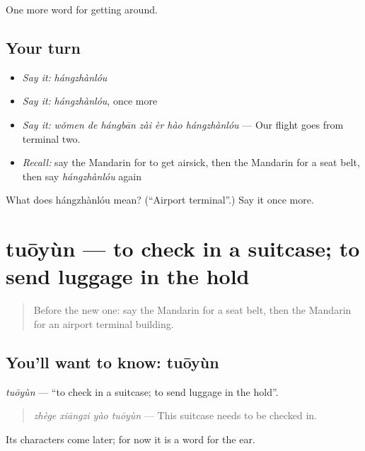 \begin{grammarlens}[title={What you've built}]
One more word for getting around.
\end{grammarlens}

\subsection*{Your turn}
\begin{itemize}
\raggedright
  \item \emph{Say it:} \emph{hángzhànlóu}
  \item \emph{Say it:} \emph{hángzhànlóu}, once more
  \item \emph{Say it:} \emph{wǒmen de hángbān zài èr hào hángzhànlóu} — Our flight goes from terminal two.
  \item \emph{Recall:} say the Mandarin for to get airsick, then the Mandarin for a seat belt, then say \emph{hángzhànlóu} again
\end{itemize}

\begin{tcolorbox}[breakable,colback=teal!4,colframe=teal!35!black,title={Before you move on}]
What does hángzhànlóu mean? (\textquotedblleft{}Airport terminal\textquotedblright{}.) Say it once more.
\end{tcolorbox}
\section[tuōyùn]{tuōyùn — to check in a suitcase; to send luggage in the hold}

\label{lesson:ZH-C415-tuoyun}



\begin{quote}
Before the new one: say the Mandarin for a seat belt, then the Mandarin for an airport terminal building.
\end{quote}

\subsection*{You'll want to know: tuōyùn}
\emph{tuōyùn} — \textquotedblleft{}to check in a suitcase; to send luggage in the hold\textquotedblright{}.

\begin{quote}
\emph{zhège xiāngzi yào tuōyùn} — This suitcase needs to be checked in.
\end{quote}

Its characters come later; for now it is a word for the ear.

